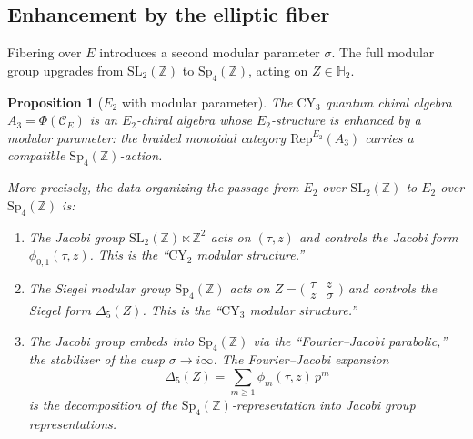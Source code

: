 \documentclass[11pt]{article}
\theoremstyle{plain}
\newtheorem{proposition}[theorem]{Proposition}
\theoremstyle{definition}
\theoremstyle{remark}
\newcommand{\CY}{\mathrm{CY}}
\newcommand{\Rep}{\mathrm{Rep}}
\newcommand{\Etwo}{E_2}
\newcommand{\cC}{\mathcal{C}}
\begin{document}
\subsection{Enhancement by the elliptic fiber}
\label{subsec:e2-enhancement}

Fibering over $E$ introduces a second modular parameter $\sigma$. The full
modular group upgrades from $\mathrm{SL}_2(\mathbb{Z})$ to
$\mathrm{Sp}_4(\mathbb{Z})$, acting on $Z \in \mathbb{H}_2$.

\begin{proposition}[$\Etwo$ with modular parameter]
\label{prop:e2-modular}
The $\CY_3$ quantum chiral algebra $A_3 = \Phi(\cC_E)$ is an $\Etwo$-chiral
algebra whose $\Etwo$-structure is enhanced by a modular parameter: the braided
monoidal category $\Rep^{\Etwo}(A_3)$ carries a compatible
$\mathrm{Sp}_4(\mathbb{Z})$-action.

More precisely, the data organizing the passage from $\Etwo$ over
$\mathrm{SL}_2(\mathbb{Z})$ to $\Etwo$ over $\mathrm{Sp}_4(\mathbb{Z})$ is:
\begin{enumerate}[label=(\roman*)]
\item The Jacobi group $\mathrm{SL}_2(\mathbb{Z}) \ltimes \mathbb{Z}^2$ acts on
 $(\tau, z)$ and controls the Jacobi form $\phi_{0,1}(\tau, z)$. This is the
 ``$\CY_2$ modular structure.''

\item The Siegel modular group $\mathrm{Sp}_4(\mathbb{Z})$ acts on
 $Z = \bigl(\begin{smallmatrix} \tau & z \\ z & \sigma \end{smallmatrix}\bigr)$
 and controls the Siegel form $\Delta_5(Z)$. This is the ``$\CY_3$ modular
 structure.''

\item The Jacobi group embeds into $\mathrm{Sp}_4(\mathbb{Z})$ via the
 ``Fourier--Jacobi parabolic,'' the stabilizer of the cusp
 $\sigma \to i\infty$. The Fourier--Jacobi expansion
 \[
 \Delta_5(Z) = \sum_{m \geq 1} \phi_m(\tau, z) \, p^m
 \]
 is the decomposition of the $\mathrm{Sp}_4(\mathbb{Z})$-representation
 into Jacobi group representations.
\end{enumerate}
\end{proposition}
\end{document}
